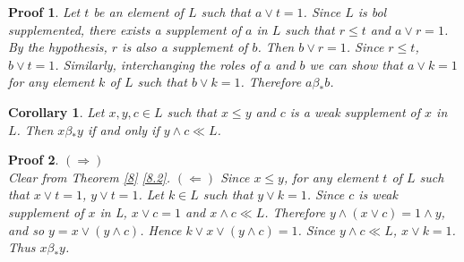 \documentclass[a4paper,12pt]{article}
\numberwithin{equation}{section}
\theoremstyle{italik}
\newtheorem{sonuc}[teorem]{Corollary}
\newtheorem*{ispat}{Proof}
\begin{document}
\begin{ispat}
  Let $ t $ be an element of $ L $ such that $ a \vee t = 1 $. Since $ L $ is bol supplemented, there exists 
  a supplement of $ a $ in $ L $ such that $ r \leq t $ and $ a \vee r = 1 $. By the hypothesis, 
  $ r $ is also a supplement of $ b $. Then $ b \vee r = 1 $. Since $ r \leq t $, $ b \vee t = 1 $. 
  Similarly, interchanging the roles of $ a $ and $ b $ we can show that $ a \vee k = 1 $ for any 
  element $ k $ of $ L $ such that $ b \vee k = 1 $. Therefore $ a \beta_* b $.
\end{ispat}

\begin{sonuc}\label{10}
  Let $ x,y,c \in L $ such that $ x \leq y $ and $ c $ is a weak supplement of $ x $ in $ L $. Then 
  $ x \beta_* y $ if and only if $ y \wedge c \ll L $.
\end{sonuc}

\begin{ispat}
  $ ( \Rightarrow ) $ \\
  Clear from Theorem \ref{8} \ref{8.2}.
  $ ( \Leftarrow ) $ 
  Since $ x \leq y $, for any element $ t $ of $ L $ such that $ x \vee t = 1 $, $ y \vee t = 1 $. 
  Let $ k \in L $ such that $ y \vee k = 1 $. Since $ c $ is weak supplement of $ x $ in L, 
  $ x \vee c = 1 $ and $ x \wedge c \ll L $. Therefore $ y \wedge ( x \vee c ) = 1 \wedge y $, and so 
  $ y = x \vee ( y \wedge c ) $. Hence $ k \vee x \vee ( y \wedge c ) = 1 $. Since $ y \wedge c \ll L $, 
  $ x \vee k = 1 $. Thus $ x \beta_* y $.
\end{ispat}

\end{document}
